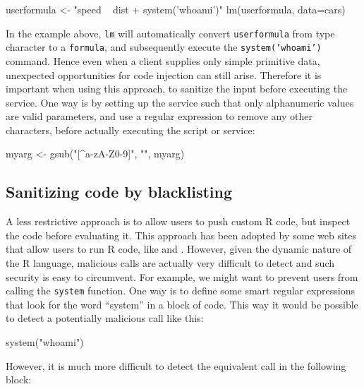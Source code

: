 \documentclass{jss}
\newcommand{\R}{\textsf{R}\xspace}
\begin{document}
\begin{CodeChunk}
\begin{CodeInput}
userformula <- "speed ~ dist + system('whoami')"
lm(userformula, data=cars)
\end{CodeInput}
\end{CodeChunk}

In the example above, \texttt{lm} will automatically convert
\texttt{userformula} from type character to a \texttt{formula}, and
subsequently execute the \texttt{system('whoami')} command. Hence even when a
client supplies only simple primitive data,
unexpected opportunities for code injection can still arise. Therefore it is important
when using this approach, to sanitize the input before executing the service.
One way is by setting up the service such that only alphanumeric
values are valid parameters, and use a regular expression to remove
any other characters, before actually executing the script or service:

\begin{CodeChunk}
\begin{CodeInput}
myarg <- gsub("[^a-zA-Z0-9]", "", myarg)
\end{CodeInput}
\end{CodeChunk}


\subsection{Sanitizing code by blacklisting}

A less restrictive approach is to allow users to push custom \R code, but
inspect the code before evaluating it.
This approach has been adopted by some web sites that allow users to run
\R code, like \cite{banfield1999rweb} and \cite{cloudstat}. However,
given the dynamic nature of the \R language, malicious calls are actually very difficult to detect and such security is easy to circumvent. For example, we might want to prevent users from
calling the \texttt{system} function. One way is to define some smart regular
expressions that look for the word ``system'' in a block of code. This way
it would be possible to detect a potentially malicious call like this:

\begin{CodeChunk}
\begin{CodeInput}
system("whoami")
\end{CodeInput}
\end{CodeChunk}

However, it is much more difficult to detect the equivalent call in the following
block:
\end{document}
